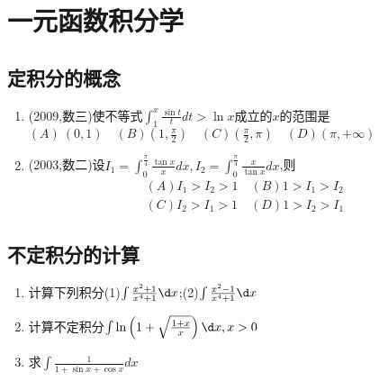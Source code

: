 \documentclass[12pt, a4paper, oneside, UTF8]{ctexbook}
\begin{document}

\else
\fi

\chapter{一元函数积分学}
\section{ 定积分的概念}

\begin{enumerate}[label=\arabic*.,start=2]
    \item (2009,数三)使不等式$\int_1^x\frac{\sin t}{t} dt>\ln x$成立的$x$的范围是 \\
        $(A)\ (0,1)\quad(B)\left(1,\frac{\pi}{2}\right)\quad
        (C)\left(\frac{\pi}{2},\pi\right)\quad(D)(\pi,+\infty)$
    
    \begin{solution}
    \newpage
    \end{solution}
    
    \item (2003,数二)设$I_1=\int_0^{\frac{\pi}{4}}\frac{\tan x}{x} dx, I_2=\int_0^{\frac{\pi}{4}}\frac{x}{\tan x} dx$,则
    \begin{align*}
        (A) I_1>I_2>1\quad(B) 1>I_1>I_2 \\
        (C) I_2>I_1>1\quad(D) 1>I_2>I_1
    \end{align*}
    
    \begin{solution}
    \newpage
    \end{solution}
\end{enumerate}

\section{ 不定积分的计算}

\begin{enumerate}[label=\arabic*.,start=4]
    \item 计算下列积分(1)$\int\frac{x^2+1}{x^4+1}\d x$;(2)$\int\frac{x^2-1}{x^4+1}\d x$
    
    \begin{solution}
    \newpage
    \end{solution}
    
    \item 计算不定积分$\int\ln\left(1+\sqrt{\frac{1+x}{x}}\right)\d x, x>0$
    
    \begin{solution}
        \newpage
    \end{solution}

    \item  求$\int\frac{1}{1+\sin x+\cos x} dx$
    
    \begin{solution}
    \newpage
    \end{solution}
\end{enumerate}
\end{document}
